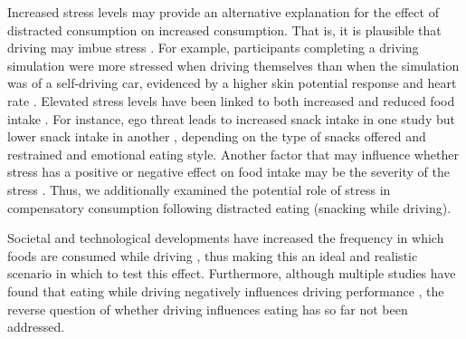 \documentclass[authordate, empirical, issue]{jote-new-article}
\begin{document}
Increased stress levels may provide an alternative explanation for the effect of distracted consumption on increased consumption. That is, it is plausible that driving may imbue stress \parencites{Antoun2017}. For example, participants completing a driving simulation were more stressed when driving themselves than when the simulation was of a self-driving car, evidenced by a higher skin potential response and heart rate \parencites{Zontone2020}. Elevated stress levels have been linked to both increased and reduced food intake \parencites{Reichenberger2018}{Torres2007}. For instance, ego threat leads to increased snack intake in one study \parencites{Wallis2004} but lower snack intake in another \parencites{Wallis2009}, depending on the type of snacks offered and restrained and emotional eating style. Another factor that may influence whether stress has a positive or negative effect on food intake may be the severity of the stress \parencites{Torres2007}. Thus, we additionally examined the potential role of stress in compensatory consumption following distracted eating (snacking while driving).



Societal and technological developments have increased the frequency in which foods \parencites[particularly high-calorie snacks][]{Hirschberg2016} are consumed while driving \parencites{Monitor2018}{Stutts2005}, thus making this an ideal and realistic scenario in which to test this effect. Furthermore, although multiple studies have found that eating while driving negatively influences driving performance \parencites{Dingus2016}{Irwin2015}{Young2008}, the reverse question of whether driving influences eating has so far not been addressed.
\end{document}
